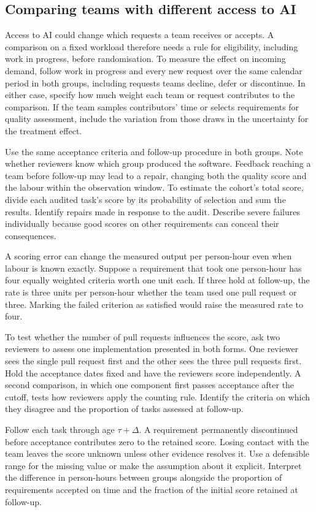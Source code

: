 \documentclass[11pt,a4paper]{amsart}
\begin{document}
\subsection{Comparing teams with different access to AI}

Access to AI could change which requests a team receives or accepts. A comparison on a fixed workload therefore needs a rule for eligibility, including work in progress, before randomisation. To measure the effect on incoming demand, follow work in progress and every new request over the same calendar period in both groups, including requests teams decline, defer or discontinue. In either case, specify how much weight each team or request contributes to the comparison. If the team samples contributors' time or selects requirements for quality assessment, include the variation from those draws in the uncertainty for the treatment effect.

Use the same acceptance criteria and follow-up procedure in both groups. Note whether reviewers know which group produced the software. Feedback reaching a team before follow-up may lead to a repair, changing both the quality score and the labour within the observation window. To estimate the cohort's total score, divide each audited task's score by its probability of selection and sum the results. Identify repairs made in response to the audit. Describe severe failures individually because good scores on other requirements can conceal their consequences.

A scoring error can change the measured output per person-hour even when labour is known exactly. Suppose a requirement that took one person-hour has four equally weighted criteria worth one unit each. If three hold at follow-up, the rate is three units per person-hour whether the team used one pull request or three. Marking the failed criterion as satisfied would raise the measured rate to four.

To test whether the number of pull requests influences the score, ask two reviewers to assess one implementation presented in both forms. One reviewer sees the single pull request first and the other sees the three pull requests first. Hold the acceptance dates fixed and have the reviewers score independently. A second comparison, in which one component first passes acceptance after the cutoff, tests how reviewers apply the counting rule. Identify the criteria on which they disagree and the proportion of tasks assessed at follow-up.

Follow each task through age $\tau+\Delta$. A requirement permanently discontinued before acceptance contributes zero to the retained score. Losing contact with the team leaves the score unknown unless other evidence resolves it. Use a defensible range for the missing value or make the assumption about it explicit. Interpret the difference in person-hours between groups alongside the proportion of requirements accepted on time and the fraction of the initial score retained at follow-up.
\end{document}

